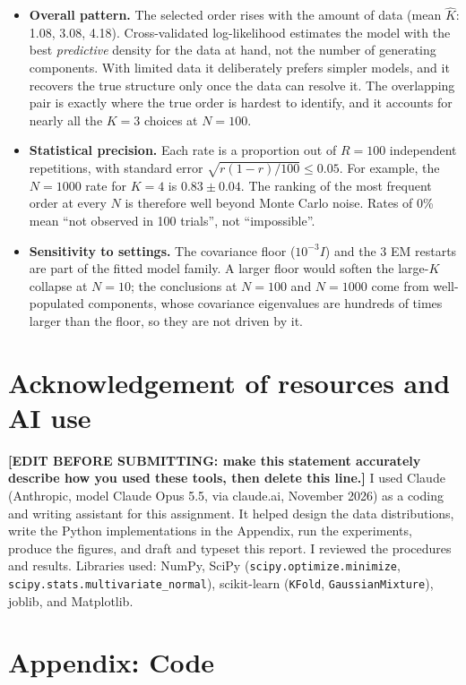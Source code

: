 \documentclass[11pt]{article}
\begin{document}
\begin{itemize}
\item \textbf{Overall pattern.} The selected order rises with the amount of data (mean $\hat K$: 1.08, 3.08, 4.18). Cross-validated log-likelihood estimates the model with the best \emph{predictive} density for the data at hand, not the number of generating components. With limited data it deliberately prefers simpler models, and it recovers the true structure only once the data can resolve it. The overlapping pair is exactly where the true order is hardest to identify, and it accounts for nearly all the $K=3$ choices at $N=100$.
\item \textbf{Statistical precision.} Each rate is a proportion out of $R=100$ independent repetitions, with standard error $\sqrt{r(1-r)/100}\le0.05$. For example, the $N=1000$ rate for $K=4$ is $0.83\pm0.04$. The ranking of the most frequent order at every $N$ is therefore well beyond Monte Carlo noise. Rates of 0\% mean ``not observed in 100 trials'', not ``impossible''.
\item \textbf{Sensitivity to settings.} The covariance floor ($10^{-3}I$) and the 3 EM restarts are part of the fitted model family. A larger floor would soften the large-$K$ collapse at $N=10$; the conclusions at $N=100$ and $N=1000$ come from well-populated components, whose covariance eigenvalues are hundreds of times larger than the floor, so they are not driven by it.
\end{itemize}


\section*{Acknowledgement of resources and AI use}
\textbf{[EDIT BEFORE SUBMITTING: make this statement accurately describe how you used these tools, then delete this line.]}
I used Claude (Anthropic, model Claude Opus 5.5, via claude.ai, November 2026) as a coding and writing assistant for this assignment. It helped design the data distributions, write the Python implementations in the Appendix, run the experiments, produce the figures, and draft and typeset this report. I reviewed the procedures and results. Libraries used: NumPy, SciPy (\texttt{scipy.optimize.minimize}, \texttt{scipy.stats.multivariate\_normal}), scikit-learn (\texttt{KFold}, \texttt{GaussianMixture}), joblib, and Matplotlib.

\newpage
\section*{Appendix: Code}
\end{document}
